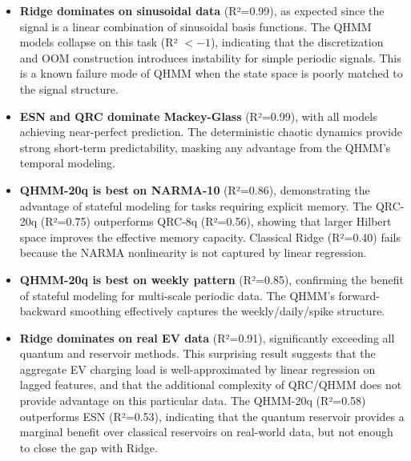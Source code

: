 \begin{itemize}
  \item \textbf{Ridge dominates on sinusoidal data} (R²=0.99), as expected
    since the signal is a linear combination of sinusoidal basis functions.
    The QHMM models collapse on this task (R² $< -1$), indicating that the
    discretization and OOM construction introduces instability for simple
    periodic signals. This is a known failure mode of QHMM when the
    state space is poorly matched to the signal structure.


  \item \textbf{ESN and QRC dominate Mackey-Glass} (R²=0.99), with all
    models achieving near-perfect prediction. The deterministic chaotic
    dynamics provide strong short-term predictability, masking any
    advantage from the QHMM's temporal modeling.


  \item \textbf{QHMM-20q is best on NARMA-10} (R²=0.86), demonstrating
    the advantage of stateful modeling for tasks requiring explicit
    memory. The QRC-20q (R²=0.75) outperforms QRC-8q (R²=0.56), showing
    that larger Hilbert space improves the effective memory capacity.
    Classical Ridge (R²=0.40) fails because the NARMA nonlinearity is not
    captured by linear regression.


  \item \textbf{QHMM-20q is best on weekly pattern} (R²=0.85), confirming
    the benefit of stateful modeling for multi-scale periodic data.
    The QHMM's forward-backward smoothing effectively captures the
    weekly/daily/spike structure.


  \item \textbf{Ridge dominates on real EV data} (R²=0.91), significantly
    exceeding all quantum and reservoir methods. This surprising result
    suggests that the aggregate EV charging load is well-approximated by
    linear regression on lagged features, and that the additional
    complexity of QRC/QHMM does not provide advantage on this particular
    data. The QHMM-20q (R²=0.58) outperforms ESN (R²=0.53), indicating
    that the quantum reservoir provides a marginal benefit over classical
    reservoirs on real-world data, but not enough to close the gap with
    Ridge.

\end{itemize}

